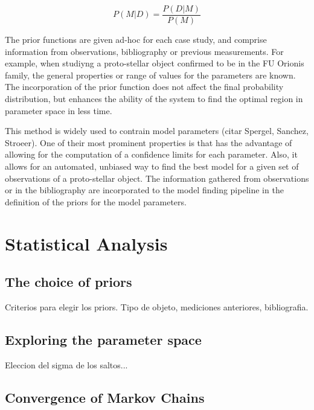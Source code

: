 \documentclass{aa}
\begin{document}
\begin{equation}
P(M|D) = \frac{P(D|M)}{P(M)}
\end{equation}

The prior functions are given ad-hoc for each case study, and comprise
information from observations, bibliography or previous measurements.
%
For example, when studiyng a proto-stellar object confirmed to be in
the FU Orionis family, the general properties or range of values for
the parameters are known.
%
The incorporation of the prior function does not affect the final
probability distribution, but enhances the ability of the system to
find the optimal region in parameter space in less time.



This method is widely used to contrain model parameters (citar
Spergel, Sanchez, Stroeer).
%
One of their most prominent properties is that has the advantage of
allowing for the computation of a confidence limits for each
parameter.
%
Also, it allows for an automated, unbiased way to find the best model
for a given set of observations of a proto-stellar object.
%
The information gathered from observations or in the bibliography are
incorporated to the model finding pipeline in the definition of the
priors for the model parameters.
%




\section{Statistical Analysis} \label{S_stats}


\subsection{The choice of priors} \label{S_}

Criterios para elegir los priors.  Tipo de objeto, mediciones
anteriores, bibliografia.

\subsection{Exploring the parameter space } \label{S_}

Eleccion del sigma de los saltos...

\subsection{Convergence of Markov Chains} \label{S_}
\end{document}
